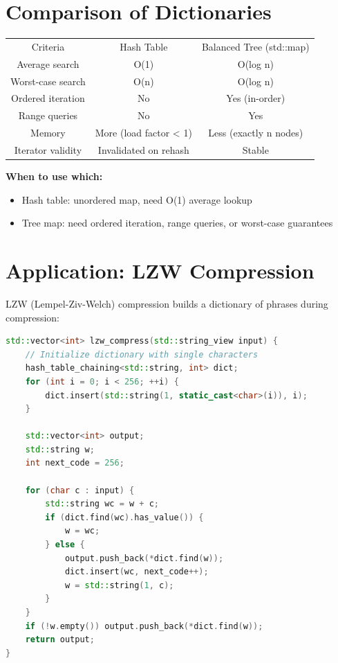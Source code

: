 \section{Comparison of Dictionaries}

\begin{center}
\begin{tabular}{ccc}
\toprule
Criteria & Hash Table & Balanced Tree (std::map) \\
Average search & O(1) & O(log n) \\
Worst-case search & O(n) & O(log n) \\
Ordered iteration & No & Yes (in-order) \\
Range queries & No & Yes \\
Memory & More (load factor < 1) & Less (exactly n nodes) \\
Iterator validity & Invalidated on rehash & Stable \\

\bottomrule
\end{tabular}
\end{center}
\textbf{When to use which:}
\begin{itemize}
\item Hash table: unordered map, need O(1) average lookup
\item Tree map: need ordered iteration, range queries, or worst-case guarantees
\end{itemize}

\section{Application: LZW Compression}

LZW (Lempel-Ziv-Welch) compression builds a dictionary of phrases during compression:

\begin{lstlisting}[language=C++]
std::vector<int> lzw_compress(std::string_view input) {
    // Initialize dictionary with single characters
    hash_table_chaining<std::string, int> dict;
    for (int i = 0; i < 256; ++i) {
        dict.insert(std::string(1, static_cast<char>(i)), i);
    }

    std::vector<int> output;
    std::string w;
    int next_code = 256;

    for (char c : input) {
        std::string wc = w + c;
        if (dict.find(wc).has_value()) {
            w = wc;
        } else {
            output.push_back(*dict.find(w));
            dict.insert(wc, next_code++);
            w = std::string(1, c);
        }
    }
    if (!w.empty()) output.push_back(*dict.find(w));
    return output;
}
\end{lstlisting}

